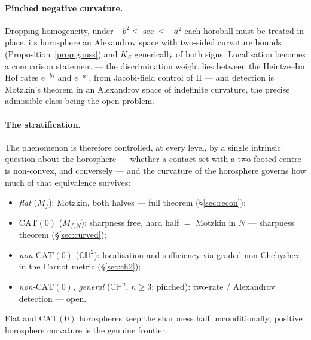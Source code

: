 \documentclass[11pt]{article}
\theoremstyle{remark}
\newcommand{\Mf}{M_{f}}
\begin{document}
\paragraph{Pinched negative curvature.} Dropping homogeneity, under
$-b^{2}\le\sec\le-a^{2}$ each horoball must be treated in place, its
horosphere an Alexandrov space with two-sided curvature bounds
(Proposition~\ref{prop:gauss}) and $K_{S}$ generically of both signs.
Localisation becomes a comparison statement --- the discrimination
weight lies between the Heintze--Im Hof rates $e^{-b\tau}$ and
$e^{-a\tau}$, from Jacobi-field control of $\mathrm{II}$ --- and
detection is Motzkin's theorem in an Alexandrov space of indefinite
curvature, the precise admissible class being the open problem.

\paragraph{The stratification.} The phenomenon is therefore controlled,
at every level, by a single intrinsic question about the horosphere ---
whether a contact set with a two-footed centre is non-convex, and
conversely --- and the curvature of the horosphere governs how much of
that equivalence survives:
\begin{itemize}
\item \emph{flat} ($\Mf$): Motzkin, both halves --- full theorem
  (\S\ref{sec:recon});
\item \emph{$\mathrm{CAT}(0)$} ($M_{f,N}$): sharpness free, hard half
  $=$ Motzkin in $N$ --- sharpness theorem (\S\ref{sec:curved});
\item \emph{non-$\mathrm{CAT}(0)$} ($\mathbb{CH}^{2}$): localisation
  and sufficiency via graded non-Chebyshev in the Carnot metric
  (\S\ref{sec:ch2});
\item \emph{non-$\mathrm{CAT}(0)$, general} ($\mathbb{CH}^{n}$, $n\ge3$;
  pinched): two-rate / Alexandrov detection --- open.
\end{itemize}
Flat and $\mathrm{CAT}(0)$ horospheres keep the sharpness half
unconditionally; positive horosphere curvature is the genuine frontier.
\end{document}
